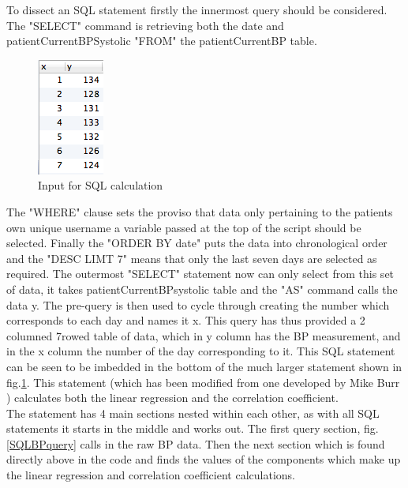 \documentclass[11pt]{article}
\begin{document}
To dissect an SQL statement firstly the innermost query should be considered. The "SELECT" command is retrieving both the date and patientCurrentBPSystolic "FROM" the patientCurrentBP table. 
\begin{figure}
\centering
\includegraphics[scale=0.4]{DB2.png}
\caption{Input for SQL calculation \label{DB2}} 
\end{figure} 
The "WHERE" clause sets the proviso that data only pertaining to the patients own unique username a variable passed at the top of the script should be selected. Finally the "ORDER BY date" puts the data into chronological order and the "DESC LIMT 7" means that only the last seven days are selected as required. The outermost "SELECT" statement now can only select from this set of data, it takes patientCurrentBPsystolic table and the "AS" command calls the data y. The pre-query is then used to cycle through creating the number which corresponds to each day and names it x. This query has thus provided a 2 columned 7rowed table of data, which in y column has the BP measurement, and in the x column the number of the day corresponding to it. This SQL statement can be seen to be imbedded in the bottom of the much larger statement shown in fig.\ref{DB2}. This statement (which has been modified from one developed by Mike Burr \cite{Mike}) calculates both the linear regression and the correlation coefficient. 
\\ \indent
The statement has 4 main sections nested within each other, as with all SQL statements it starts in the middle and works out. The first query section, fig.\ref{SQLBPquery} calls in the raw BP data. Then the next section which is found directly above in the code and finds the values of the components which make up the linear regression and correlation coefficient calculations. 
\end{document}
